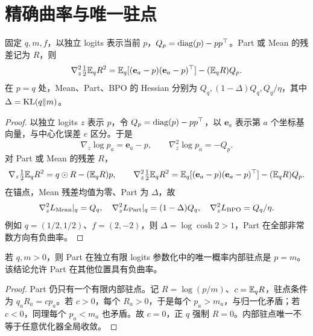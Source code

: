 \section{精确曲率与唯一驻点}
\begin{proposition}[平方回归曲率及锚点差异]
固定 $q,m,f$，以独立 logits 表示当前 $p$，$Q_p=\operatorname{diag}(p)-pp^\top$。Part 或 Mean 的残差记为 $R$，则
\begin{equation}
\nabla_z^2\tfrac12\mathbb E_qR^2=\mathbb E_q[(\mathbf e_a-p)(\mathbf e_a-p)^\top]-(\mathbb E_qR)Q_p.
\end{equation}
在 $p=q$ 处，Mean、Part、BPO 的 Hessian 分别为 $Q_q,(1-\Delta)Q_q,Q_q/\eta$，其中 $\Delta=\operatorname{KL}(q\Vert m)$。
\end{proposition}
\begin{proof}
以独立 logits $z$ 表示 $p$，令 $Q_p=\operatorname{diag}(p)-pp^\top$，以 $\mathbf e_a$ 表示第 $a$ 个坐标基向量，与中心化误差 $e$ 区分。于是
\begin{equation}
\nabla_z\log p_a=\mathbf e_a-p,\qquad \nabla_z^2\log p_a=-Q_p.
\end{equation}
对 Part 或 Mean 的残差 $R$，
\begin{equation}
\nabla_z\tfrac12\mathbb E_qR^2=q\odot R-(\mathbb E_qR)p,\qquad
\nabla_z^2\tfrac12\mathbb E_qR^2
=\mathbb E_q[(\mathbf e_a-p)(\mathbf e_a-p)^\top]-(\mathbb E_qR)Q_p.
\end{equation}
在锚点，Mean 残差均值为零、Part 为 $\Delta$，故
\begin{equation}
\nabla_z^2L_{\rm Mean}|_q=Q_q,\quad
\nabla_z^2L_{\rm Part}|_q=(1-\Delta)Q_q,\quad
\nabla_z^2L_{\rm BPO}=Q_q/\eta.
\end{equation}
例如 $q=(1/2,1/2)$、$f=(2,-2)$，则 $\Delta=\log\cosh2>1$，Part 在全部非常数方向有负曲率。
\end{proof}

\begin{theorem}
若 $q,m>0$，则 Part 在独立有限 logits 参数化中的唯一概率内部驻点是 $p=m$。该结论允许 Part 在其他位置具有负曲率。
\end{theorem}
\begin{proof}
Part 仍只有一个有限内部驻点。记 $R=\log(p/m)$、$c=\mathbb E_qR$，驻点条件为 $q_aR_a=cp_a$。若 $c>0$，每个 $R_a>0$，于是每个 $p_a>m_a$，与归一化矛盾；若 $c<0$，同理每个 $p_a<m_a$ 也矛盾。故 $c=0$，正 $q$ 强制 $R=0$。内部驻点唯一不等于任意优化器全局收敛。
\end{proof}

